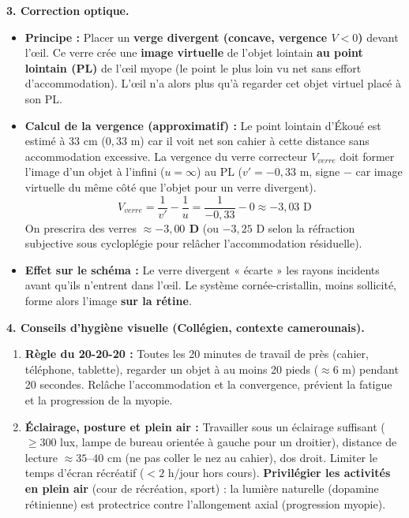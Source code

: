 \documentclass[11pt]{article}
\begin{document}
\begin{exoresolu}
\textbf{3. Correction optique.}
\begin{itemize}
    \item \textbf{Principe :} Placer un \textbf{verge divergent (concave, vergence $V < 0$)} devant l'œil. Ce verre crée une \textbf{image virtuelle} de l'objet lointain \textbf{au point lointain (PL)} de l'œil myope (le point le plus loin vu net sans effort d'accommodation). L'œil n'a alors plus qu'à regarder cet objet virtuel placé à son PL.
    \item \textbf{Calcul de la vergence (approximatif) :} Le point lointain d'Ékoué est estimé à $33$ cm ($0,33$ m) car il voit net son cahier à cette distance sans accommodation excessive. La vergence du verre correcteur $V_{verre}$ doit former l'image d'un objet à l'infini ($u = \infty$) au PL ($v' = -0,33$ m, signe $-$ car image virtuelle du même côté que l'objet pour un verre divergent).
    \[ V_{verre} = \frac{1}{v'} - \frac{1}{u} = \frac{1}{-0,33} - 0 \approx -3,03 \text{ D} \]
    On prescrira des verres \textbf{$\approx -3,00$ D} (ou $-3,25$ D selon la réfraction subjective sous cycloplégie pour relâcher l'accommodation résiduelle).
    \item \textbf{Effet sur le schéma :} Le verre divergent « écarte » les rayons incidents avant qu'ils n'entrent dans l'œil. Le système cornée-cristallin, moins sollicité, forme alors l'image \textbf{sur la rétine}.
\end{itemize}

\textbf{4. Conseils d'hygiène visuelle (Collégien, contexte camerounais).}
\begin{enumerate}
    \item \textbf{Règle du 20-20-20 :} Toutes les 20 minutes de travail de près (cahier, téléphone, tablette), regarder un objet à au moins 20 pieds ($\approx 6$ m) pendant 20 secondes. Relâche l'accommodation et la convergence, prévient la fatigue et la progression de la myopie.
    \item \textbf{Éclairage, posture et plein air :} Travailler sous un éclairage suffisant ($\ge 300$ lux, lampe de bureau orientée à gauche pour un droitier), distance de lecture $\approx 35$--$40$ cm (ne pas coller le nez au cahier), dos droit. Limiter le temps d'écran récréatif ($< 2$ h/jour hors cours). \textbf{Privilégier les activités en plein air} (cour de récréation, sport) : la lumière naturelle (dopamine rétinienne) est protectrice contre l'allongement axial (progression myopie).
\end{enumerate}


\end{exoresolu}
\end{document}
